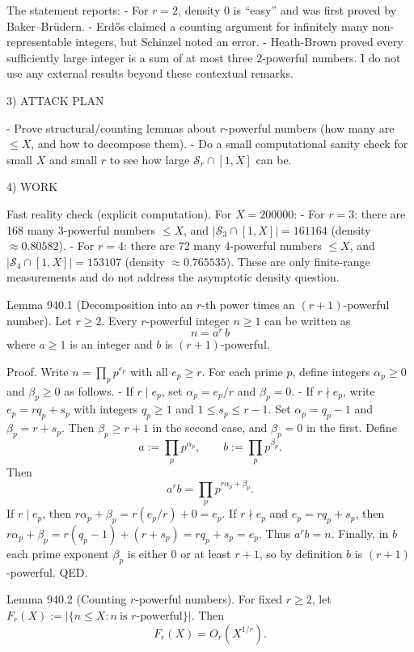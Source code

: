 The statement reports:
- For \(r=2\), density 0 is ``easy'' and was first proved by Baker--Br\"{u}dern.
- Erd\H{o}s claimed a counting argument for infinitely many non-representable integers, but Schinzel noted an error.
- Heath-Brown proved every sufficiently large integer is a sum of at most three 2-powerful numbers.
I do not use any external results beyond these contextual remarks.

3) ATTACK PLAN

- Prove structural/counting lemmas about \(r\)-powerful numbers (how many are \(\le X\), and how to decompose them).
- Do a small computational sanity check for small \(X\) and small \(r\) to see how large \(\mathcal S_r\cap[1,X]\) can be.

4) WORK

Fast reality check (explicit computation).
For \(X=200000\):
- For \(r=3\): there are 168 many 3-powerful numbers \(\le X\), and \(|\mathcal S_3\cap[1,X]|=161164\) (density \(\approx 0.80582\)).
- For \(r=4\): there are 72 many 4-powerful numbers \(\le X\), and \(|\mathcal S_4\cap[1,X]|=153107\) (density \(\approx 0.765535\)).
These are only finite-range measurements and do not address the asymptotic density question.

Lemma 940.1 (Decomposition into an \(r\)-th power times an \((r+1)\)-powerful number).
Let \(r\ge 2\). Every \(r\)-powerful integer \(n\ge 1\) can be written as
\[n=a^r\,b\]
where \(a\ge 1\) is an integer and \(b\) is \((r+1)\)-powerful.

Proof.
Write \(n=\prod_p p^{e_p}\) with all \(e_p\ge r\).
For each prime \(p\), define integers \(\alpha_p\ge 0\) and \(\beta_p\ge 0\) as follows.
- If \(r\mid e_p\), set \(\alpha_p=e_p/r\) and \(\beta_p=0\).
- If \(r\nmid e_p\), write \(e_p=rq_p+s_p\) with integers \(q_p\ge 1\) and \(1\le s_p\le r-1\). Set \(\alpha_p=q_p-1\) and \(\beta_p=r+s_p\).
Then \(\beta_p\ge r+1\) in the second case, and \(\beta_p=0\) in the first.
Define
\[a:=\prod_p p^{\alpha_p},\qquad b:=\prod_p p^{\beta_p}.
\]
Then
\[a^r b = \prod_p p^{r\alpha_p+\beta_p}.
\]
If \(r\mid e_p\), then \(r\alpha_p+\beta_p=r(e_p/r)+0=e_p\). If \(r\nmid e_p\) and \(e_p=rq_p+s_p\), then
\(r\alpha_p+\beta_p=r(q_p-1)+(r+s_p)=rq_p+s_p=e_p\).
Thus \(a^r b=n\).
Finally, in \(b\) each prime exponent \(\beta_p\) is either 0 or at least \(r+1\), so by definition \(b\) is \((r+1)\)-powerful.
QED.

Lemma 940.2 (Counting \(r\)-powerful numbers).
For fixed \(r\ge 2\), let \(F_r(X):=|\{n\le X: n\ \text{is $r$-powerful}\}|\). Then
\[F_r(X)=O_r(X^{1/r}).\]

